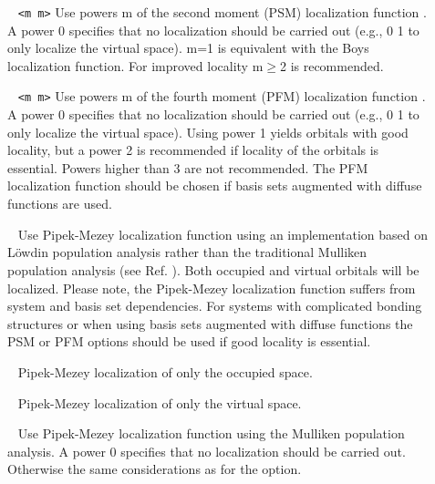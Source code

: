 \begin{description}

\item[]\verb| | \newline
\verb|<m m>|\newline
Use powers m of the second moment (PSM) localization function \cite{jansik:2011}.  A power 0 specifies that no localization should be carried out (e.g., 0 1  to only localize the virtual space). m=1 is equivalent with the Boys localization function. For improved locality m$\ge$2 is recommended. 

\item[]\verb| | \newline
\verb|<m m>|\newline
Use powers m of the fourth moment (PFM) localization function \cite{hoyvik:PFM}.  A power 0 specifies that no localization should be carried out (e.g., 0 1  to only localize the virtual space). Using power 1 yields orbitals with good locality, but a power 2 is recommended if locality of the orbitals is essential. Powers higher than 3 are not recommended.  The PFM localization function should be chosen if basis sets augmented with diffuse functions are used.

\item[]\verb| | \newline
Use Pipek-Mezey localization function using an implementation based on L{\"o}wdin population analysis 
rather than the traditional Mulliken population analysis (see Ref. \cite{hoyvik:PM}).  Both occupied and virtual orbitals will be localized. Please note, the Pipek-Mezey localization function suffers from system and basis set dependencies. For systems with complicated bonding structures or when using basis sets augmented with diffuse functions the PSM or PFM options should be used if good locality is essential.

\item[]\verb| | \newline
Pipek-Mezey localization of only the occupied space.


\item[]\verb| | \newline
Pipek-Mezey localization of only the virtual space.


\item[]\verb| | \newline
Use Pipek-Mezey localization function using the Mulliken population analysis. A power 0 specifies that no localization should be carried out.  Otherwise the same considerations as for the  option.



\end{description}

